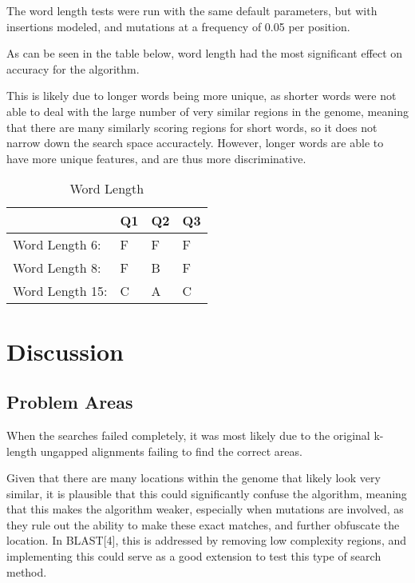 \documentclass[12pt, conference]{IEEEtran}
\begin{document}
	The word length tests were run with the same default parameters, but with insertions modeled, and mutations at a frequency of 0.05 per position.
	
	As can be seen in the table below, word length had the most significant effect on accuracy for the algorithm.
	
	This is likely due to longer words being more unique, as shorter words were not able to deal with the large number of very similar regions in the genome, meaning that there are many similarly scoring regions for short words, so it does not narrow down the search space accuractely. However, longer words are able to have more unique features, and are thus more discriminative. 
	
		\begin{table}[htbp]
	\centering
	\caption{Word Length}
	\label{wlen}
	\begin{tabular}{|l|l|l|l|}
	\hline
										 & Q1 & Q2 & Q3 \\ \hline
	Word Length 6:     &  F & F  & F \\ \hline
	Word Length 8:     &  F & B  & F  \\ \hline
	Word Length 15:    &  C & A  & C  \\ \hline
	\end{tabular}
	\end{table}
	
	
\section{\textbf{Discussion}}

	\subsection{\textbf{Problem Areas}}
	
	When the searches failed completely, it was most likely due to the original k-length ungapped alignments failing to find the correct areas.
	
	Given that there are many locations within the genome that likely look very similar, it is plausible that this could significantly confuse the algorithm, meaning that this makes the algorithm weaker, especially when mutations are involved, as they rule out the ability to make these exact matches, and further obfuscate the location. In BLAST[4], this is addressed by removing low complexity regions, and implementing this could serve as a good extension to test this type of search method.
	
\end{document}
